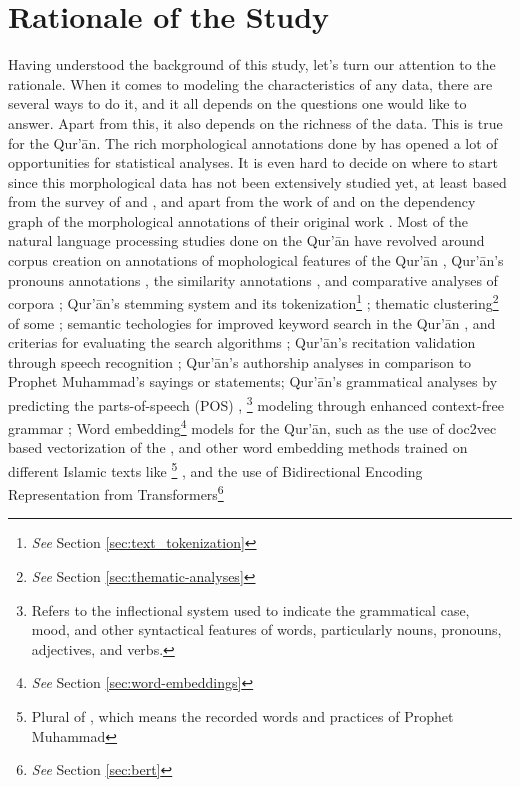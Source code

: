 \section{Rationale of the Study}\label{sec:rationale}
Having understood the background of this study, let's turn our attention to the rationale. When it comes to modeling the characteristics of any data, there are several ways to do it, and it all depends on the questions one would like to answer. Apart from this, it also depends on the richness of the data. This is true for the Qur'\=an. The rich morphological annotations done by  has opened a lot of opportunities for statistical analyses. It is even hard to decide on where to start since this morphological data has not been extensively studied yet, at least based from the survey of  and , and apart from the work of   and  on the dependency graph of the morphological annotations of their original work \cite{dukes-habash-2010-morphological}. Most of the natural language processing studies done on the Qur'\=an have revolved around corpus creation on annotations of mophological features of the Qur'\=an , Qur'\=an's pronouns annotations , the   similarity annotations , and comparative analyses of corpora ; Qur'\=an's stemming system  and its tokenization\footnote{\textit{See} Section \ref{sec:text_tokenization}} ; thematic clustering\footnote{\textit{See} Section \ref{sec:thematic-analyses}} of some   ; semantic techologies for improved keyword search in the Qur'\=an , and criterias for evaluating the search algorithms ; Qur'\=an's recitation validation through speech recognition ; Qur'\=an's authorship analyses in comparison to Prophet Muhammad's  sayings or statements; Qur'\=an's grammatical analyses by predicting the parts-of-speech (POS) ,  \footnote{Refers to the inflectional system used to indicate the grammatical case, mood, and other syntactical features of words, particularly nouns, pronouns, adjectives, and verbs.} modeling through enhanced context-free grammar ; Word embedding\footnote{\textit{See} Section \ref{sec:word-embeddings}} models for the Qur'\=an, such as the use of doc2vec based vectorization of the   , and other word embedding methods trained on different Islamic texts like  \footnote{Plural of  , which means the recorded words and practices of Prophet Muhammad } , and the use of Bidirectional Encoding Representation from Transformers\footnote{\textit{See} Section \ref{sec:bert}} 